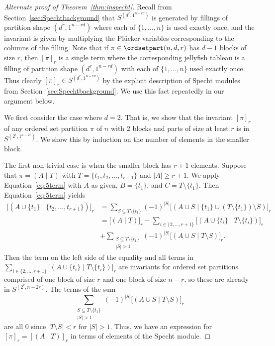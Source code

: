 \begin{proof}[Alternate proof of Theorem~\ref{thm:inspecht}]
Recall from Section~\ref{sec:Spechtbackground} that $S^{(d^r,1^{n- rd})}$ is generated by fillings of partition shape $(d^r,1^{n-r d})$ where each of $\{1,\ldots,n\}$ is used exactly once, and the invariant is given by multiplying the Pl\"ucker variables corresponding to the columns of the filling. Note that if $ \pi \in \ordsetpart(n,d,r)$ has $d-1$ blocks of size $r$, then $[\pi]_r$ is a single term where the corresponding jellyfish tableau is a filling of partition shape $(d^r,1^{n-r d})$ with each of $\{1,\ldots,n\}$ used exactly once. Thus clearly $[\pi]_r\in S^{(d^r,1^{n-r d})}$ by the explicit description of Specht modules from Section~\ref{sec:Spechtbackground}. We use this fact repeatedly in our argument below.

We first consider the case where $d=2$. That is, we show that the invariant $[\pi]_r$ of any ordered set partition $\pi$ of $n$ with 2 blocks and parts of size at least $r$ is in $S^{(2^r,1^{n-2r})}$. We show this by induction on the number of elements in the smaller block.

The first non-trivial case is when the smaller block has $r+1$ elements. Suppose that $\pi=(A \mid T)$ with $T=\{t_1,t_2,\ldots,t_{r+1}\}$ and $|A|\geq r+1$. We apply Equation~\eqref{eq:5term} with $A$ as given, $B=\{t_1\}$, and $C=T\setminus \{t_1\}$. Then Equation~\eqref{eq:5term} yields
\begin{align*}
\big[(A\cup \{t_1\} \mid \{t_2,\ldots,t_{r+1}\})\big]_r&=\sum_{S\subseteq T\setminus \{t_1\}}(-1)^{|S|}\big[(A\cup S \mid \{t_1\}\cup (T\setminus \{t_1\})\setminus S)\big]_r\\
&=\big[(A \mid T)\big]_r-\sum_{i\in\{2,\ldots,r+1\}}\big[(A\cup \{t_i\} \mid T\setminus \{t_i\})\big]_r\\
&+\sum_{\substack{S\subseteq T\setminus \{t_1\} \\ |S|>1}}(-1)^{|S|}\big[(A\cup S \mid T\setminus S)\big]_r.
\end{align*}
Then the term on the left side of the equality and all terms in $\sum_{i\in\{2,\ldots,r+1\}}\big[(A\cup \{t_i\} \mid T\setminus \{t_i\})\big]_r$ are invariants for ordered set partitions comprised of one block of size $r$ and one block of size $n-r$, so these are already in $S^{(2^r, n-2r)}$. The terms of the sum 
\[\sum_{\substack{S\subseteq T\setminus \{t_1\} \\ |S|>1}}(-1)^{|S|}\big[(A\cup S \mid T\setminus S)\big]_r
\]
are all $0$ since $|T\setminus S|<r$ for $|S|>1$. Thus, we have an expression for $[\pi]_r=[(A \mid T)]_r$ in terms of elements of the Specht module. 


\end{proof}
